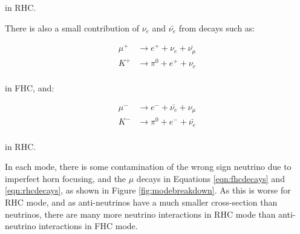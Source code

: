 in RHC. 

There is also a small contribution of $\nu_e$ and $\bar{\nu_e}$ from decays such as:

\begin{equation}
\begin{aligned}
\mu^{+} &\rightarrow e^+ + \nu_e + \bar{\nu_{\mu}}\\
K^{+} &\rightarrow \pi^0 + e^{+} + \nu_e\\
 \end{aligned}
\end{equation}\label{eqn:fhcdecays}

in FHC, and:

\begin{equation}
\begin{aligned}
\mu^{-} &\rightarrow e^- + \bar{\nu_e} + \nu_{\mu}\\
K^{-} &\rightarrow \pi^0 + e^{-} + \bar{\nu_e}\\
 \end{aligned}
\end{equation}\label{eqn:rhcdecays}

in RHC.

In each mode, there is some contamination of the wrong sign neutrino due to imperfect horn focusing, and the $\mu$ decays in Equations \ref{eqn:fhcdecays} and \ref{eqn:rhcdecays}, as shown in Figure \ref{fig:modebreakdown}. As this is worse for RHC mode, and as anti-neutrinos have a much smaller cross-section than neutrinos, there are many more neutrino interactions in RHC mode than anti-neutrino interactions in FHC mode.

